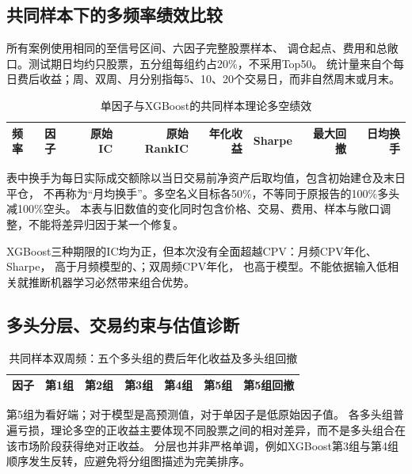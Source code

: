 \documentclass[UTF8,zihao=-4,fontset=fandol]{ctexart}
\renewcommand{\arraystretch}{1.28}
\begin{document}
\clearpage
\subsection{共同样本下的多频率绩效比较}
所有案例使用相同的\ComparisonStart 至\ComparisonEnd 信号区间、六因子完整股票样本、
调仓起点、费用和总敞口。测试期日均约\CommonMeanStocks 只股票，五分组每组约占20\%，不采用Top50。
统计量来自\ReturnDays 个每日费后收益；周、双周、月分别指每5、10、20个交易日，而非自然周末或月末。

\begin{table}[H]\centering\small
\caption{单因子与XGBoost的共同样本理论多空绩效}
\setlength{\tabcolsep}{4pt}\renewcommand{\arraystretch}{1.22}
\begin{tabular}{llrrrrrr}\toprule
频率 & 因子 & 原始IC & 原始RankIC & 年化收益 & Sharpe & 最大回撤 & 日均换手\\\midrule
\bottomrule
\end{tabular}\end{table}

表中换手为每日实际成交额除以当日交易前净资产后取均值，包含初始建仓及末日平仓，
不再称为“月均换手”。多空名义目标各50\%，不等同于原报告的100\%多头减100\%空头。
本表与旧数值的变化同时包含价格、交易、费用、样本与敞口调整，不能将差异归因于某一个修复。

XGBoost三种期限的IC均为正，但本次没有全面超越CPV：月频CPV年化\CPVMonthReturn、Sharpe\CPVMonthSharpe，
高于月频模型的\ModelMonthReturn、\ModelMonthSharpe；双周频CPV年化\CPVBiweekReturn，
也高于模型\ModelBiweekReturn。不能依据输入低相关就推断机器学习必然带来组合优势。

\clearpage
\subsection{多头分层、交易约束与估值诊断}
\begin{table}[H]\centering\small
\caption{共同样本双周频：五个多头组的费后年化收益及多头组回撤}
\begin{tabular}{lrrrrrr}\toprule
因子 & 第1组 & 第2组 & 第3组 & 第4组 & 第5组 & 第5组回撤\\\midrule
\bottomrule
\end{tabular}\end{table}
第5组为看好端；对于模型是高预测值，对于单因子是低原始因子值。
各多头组普遍亏损，理论多空的正收益主要体现不同股票之间的相对差异，而不是多头组合在该市场阶段获得绝对正收益。
分层也并非严格单调，例如XGBoost第3组与第4组顺序发生反转，应避免将分组图描述为完美排序。
\end{document}
